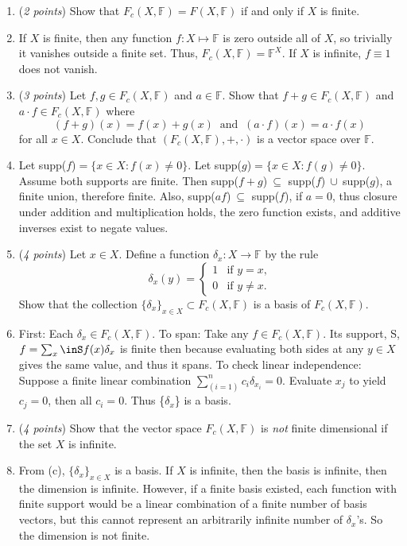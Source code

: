 \documentclass[11pt]{article}
\newcommand{\bbF}{\mathbb{F}}
\theoremstyle{definition}
\numberwithin{equation}{subsection}
\begin{document}
\begin{enumerate}
\begin{enumerate}
\item (\emph{2 points}) Show that $F_c(X,\bbF)=F(X,\bbF)$ if and only if $X$ is finite.
\item[] If $X$ is finite, then any function $f:X\mapsto \bbF$ is zero outside all of $X$, so trivially it vanishes outside a finite set. Thus, $F_c(X,\bbF)=\bbF^X$. If $X$ is infinite, $f\equiv1$ does not vanish.
\item (\emph{3 points}) Let $f,g \in F_c(X,\bbF)$ and $a\in \bbF$. Show that $f+g \in F_c(X,\bbF)$ and $a\cdot f\in F_c(X,\bbF)$ where
$$(f+g)(x) = f(x)+g(x)\;\; \text{and} \;\; (a\cdot f)(x)=a\cdot f(x)$$ for all $x\in X$. Conclude that $(F_c(X,\bbF),+,\cdot)$ is a vector space over $\bbF$.
\item[] Let supp($f$)$=\{x\in X : f(x) \neq0\}$. Let supp($g$)$=\{x\in X : f(g) \neq0\}$. Assume both supports are finite. Then supp($f+g$)$\ \subseteq$ supp($f$)$\ \cup\ $supp($g$), a finite union, therefore finite. Also, supp($af$)$\ \subseteq$ supp($f$), if $a=0$, thus closure under addition and multiplication holds, the zero function exists, and additive inverses exist to negate values.
\item (\emph{4 points}) Let $x\in X$. Define a function $\delta_x\colon X \to \bbF$ by the rule
$$\delta_x(y) = 
\begin{cases}
1 & \mbox{if $y=x$,}\\
0 & \mbox{if $y\neq x$.}
\end{cases}
$$
Show that the collection $\{\delta_x\}_{x\in X} \subset F_c(X,\bbF)$ is a basis of $F_c(X,\bbF)$.
\item[] First: Each $\delta_x \in F_c(X,\bbF)$. To span: Take any $f\in F_c(X,\bbF)$. Its support, S, $f=\sum_x\inS f(x)\delta_x$ is finite then because evaluating both sides at any $y\in X$ gives the same value, and thus it spans. To check  linear independence: Suppose a finite linear combination $\sum_(i=1)^n c_i\delta_{x_i}=0$. Evaluate $x_j$ to yield $c_j=0$, then all $c_i=0$. Thus \{$\delta_x$\} is a basis.
\item (\emph{4 points}) Show that the vector space $F_c(X,\bbF)$ is \emph{not} finite dimensional if the set $X$ is infinite.
\item[] From (c), $\{\delta_x\}_{x\in X}$ is a basis. If $X$ is infinite, then the basis is infinite, then the dimension is infinite. However, if a finite basis existed, each function with finite support would be a linear combination of a finite number of basis vectors, but this cannot represent an arbitrarily infinite number of $\delta_x$'s. So the dimension is not finite.
\end{enumerate}

\end{enumerate}
\end{document}

